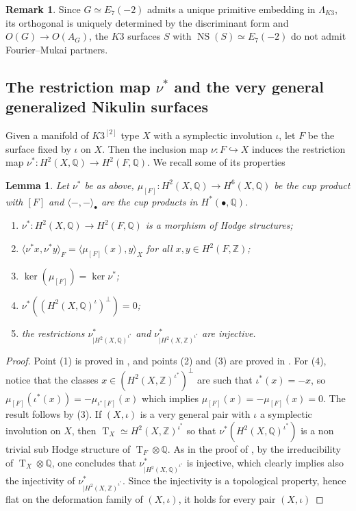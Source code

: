 \documentclass{amsart}
\newtheorem{lemma}[thm]{Lemma}
\theoremstyle{definition}
\newtheorem{rem}[thm]{Remark}
\numberwithin{equation}{section}
\numberwithin{equation}{section} \theoremstyle{definition}
\DeclareMathOperator{\NS}{NS}
\DeclareMathOperator{\T}{T}
\newcommand\Q{\mathbb Q}
\newcommand{\ra}{\rightarrow}
\newcommand\Z{\mathbb{Z}}
\begin{document}
\begin{rem}{\rm Since $G\simeq E_7(-2)$ admits a unique primitive embedding in $\Lambda_{K3}$, its orthogonal is uniquely determined by the discriminant form and $O(G)\rightarrow O(A_G)$, the $K3$ surfaces $S$ with $\NS(S)\simeq E_7(-2)$ do not admit Fourier--Mukai partners.}\end{rem}


\subsection{The restriction map $\nu^*$ and the very general generalized Nikulin surfaces}
Given a  manifold of $K3^{[2]}$ type $X$ with a symplectic involution $\iota$, let $F$ be the surface fixed by $\iota$ on $X$. Then the inclusion map $\nu:F\hookrightarrow X$ induces the restriction map $\nu^*:H^2(X,\Q)\ra H^2(F,\Q)$. We recall some of its properties
\begin{lemma}\label{lemma: properties of nu*}Let $\nu^*$ be as above, $\mu_{[F]}:H^2(X,\Q)\ra H^6(X,\Q)$ be the cup product with $[F]$ and $\langle - ,- \rangle_{\bullet}$ are the cup products in $H^*(\bullet,\Q)$. \begin{enumerate}
\item
$\nu^*\colon H^2(X,\mathbb Q)\to H^2(F,\mathbb Q)$ is a morphism of Hodge structures;
\item $\langle \nu^*x,\nu^*y\rangle_F= \langle \mu_{[F]}(x),y\rangle_X$  for all $x,y\in H^2(F,\mathbb{Z})$;
\item $\ker(\mu_{[F]}) = \ker \nu^*$;
\item $\nu^*((H^2(X,\Q)^{\iota})^{\perp})=0$;
\item the restrictions $\nu^*_{{|H^2(X,\Q)}^{\iota^*}}$ and $\nu^*_{{|H^2(X,\Z)}^{\iota^*}}$ are injective.
\end{enumerate}
\end{lemma}
\begin{proof}
Point (1) is proved in \cite[Proposition 3.16]{CGKK}, and points (2) and (3) are proved in \cite[Proposition B.2 and Remark B.3]{Vo}. For (4), notice that the classes $x\in (H^2(X,\Z)^{\iota^*})^{\perp}$ are such that $\iota^*(x)=-x$, so $\mu_{[F]}(\iota^*(x))=-\mu_{\iota^*[F]}(x)$ which implies $\mu_{[F]}(x)=-\mu_{[F]}(x)=0$. The result follows by (3). If $(X,\iota)$ is a very general pair with $\iota$ a symplectic involution on $X$, then $\T_X\simeq H^2(X,\Z)^{\iota^*}$ so that $\nu^*(H^2(X,\Q)^{\iota^*})$ is a non trivial sub Hodge structure of $\T_F\otimes \Q$. As in the proof of \cite[Proposition 3.16]{CGKK}, by the irreducibility of $\T_X\otimes \Q$, one concludes that  $\nu^*_{{|H^2(X,\Q)}^{\iota^*}}$ is injective, which clearly implies also the injectivity of $\nu^*_{{|H^2(X,\Z)}^{\iota^*}}$.  Since the injectivity is a topological property, hence flat on the deformation family of $(X,\iota)$, it holds for every pair $(X,\iota)$
\end{proof}
\end{document}

